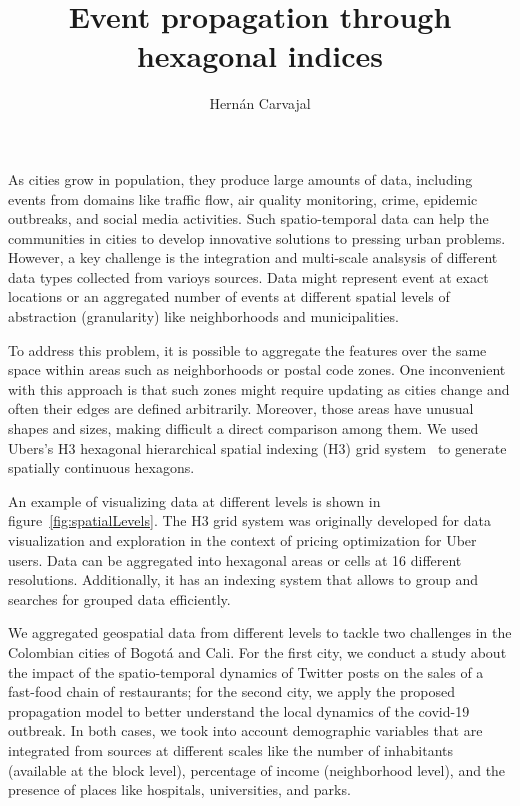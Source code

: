 \documentclass{article}
\title{Event propagation through hexagonal indices}
\author{Hernán Carvajal}
\begin{document}
\maketitle

As cities grow in population, they produce large amounts of data, including events from domains like traffic flow, air quality monitoring, crime, epidemic outbreaks, and social media activities. Such spatio-temporal data can help the communities in cities to develop innovative solutions to pressing urban problems. However, a key challenge is the integration and multi-scale analsysis of different data types collected from varioys sources. Data might represent event at exact locations or an aggregated number of events at different spatial levels of abstraction (granularity) like neighborhoods and municipalities.

To address this problem, it is possible to aggregate the features over the same space within areas such as neighborhoods or postal code zones. One inconvenient with this approach is that such zones might require updating as cities change and often their edges are defined arbitrarily. Moreover, those areas have unusual shapes and sizes, making difficult a direct comparison among them. We used Ubers's H3 hexagonal hierarchical spatial indexing (H3) grid system~\cite{uber2019} to generate spatially continuous hexagons.

An example of visualizing data at different levels is shown in figure~\ref{fig:spatialLevels}. The H3 grid system was originally developed for  data visualization and exploration in the context of pricing optimization for Uber users. Data can be aggregated into hexagonal areas or cells at 16 different resolutions. Additionally, it has an indexing system that allows to group and searches for grouped data efficiently.

We aggregated geospatial data from different levels to tackle two challenges in the Colombian cities of Bogot\'a and Cali. For the first city, we conduct a study about the impact of the spatio-temporal dynamics of Twitter posts on the sales of a fast-food chain of restaurants; for the second city, we apply the proposed propagation model to better understand the local dynamics of the covid-19 outbreak. In both cases, we took into account demographic variables that are integrated from sources at different scales like the number of inhabitants (available at the block level), percentage of income (neighborhood level), and the presence of places like hospitals, universities, and parks.
\end{document}
